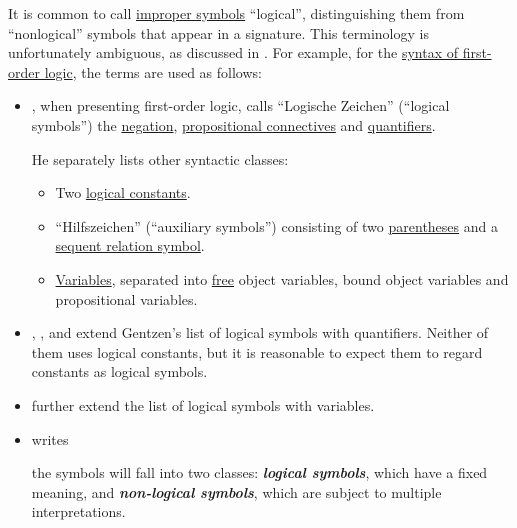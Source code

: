 \begin{remark}\label{rem:logical_symbol_terminology}
  It is common to call \hyperref[con:improper_symbol]{improper symbols} \enquote{logical}, distinguishing them from \enquote{nonlogical} symbols that appear in a signature. This terminology is unfortunately ambiguous, as discussed in \cite{MathSE:are_variables_logical_symbols}. For example, for the \hyperref[def:first_order_syntax]{syntax of first-order logic}, the terms are used as follows:
  \begin{itemize}
    \item {}, when presenting first-order logic, calls \enquote{Logische Zeichen} (\enquote{logical symbols}) the \hyperref[def:propositional_alphabet/negation]{negation}, \hyperref[def:propositional_alphabet/connectives]{propositional connectives} and \hyperref[def:predicate_logic_alphabet/quantifiers]{quantifiers}.

    He separately lists other syntactic classes:
    \begin{itemize}
      \item Two \hyperref[def:propositional_alphabet/constants]{logical constants}.
      \item \enquote{Hilfszeichen} (\enquote{auxiliary symbols}) consisting of two \hyperref[def:propositional_alphabet/parentheses]{parentheses} and a \hyperref[def:sequent]{sequent relation symbol}.
      \item \hyperref[con:variable]{Variables}, separated into \hyperref[con:variable_binding]{free} object variables, bound object variables and propositional variables.
    \end{itemize}

    \item {}, ,  and  extend Gentzen's list of logical symbols with quantifiers. Neither of them uses logical constants, but it is reasonable to expect them to regard constants as logical symbols.

    \item {} further extend the list of logical symbols with variables.

    \item {} writes
    \begin{displayquote}
      \textellipsis the symbols will fall into two classes: \textit{\textbf{logical symbols}}, which have a fixed meaning, and \textit{\textbf{non-logical symbols}}, which are subject to multiple interpretations.
    \end{displayquote}


\end{itemize}
\end{remark}
